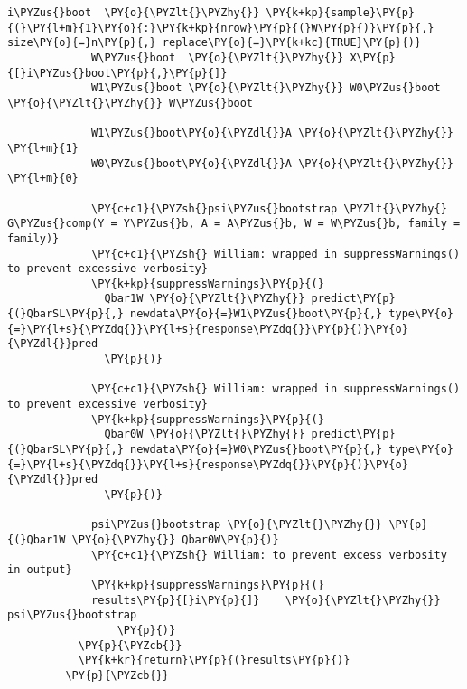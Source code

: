 \begin{Verbatim}[commandchars=\\\{\}]
             i\PYZus{}boot  \PY{o}{\PYZlt{}\PYZhy{}} \PY{k+kp}{sample}\PY{p}{(}\PY{l+m}{1}\PY{o}{:}\PY{k+kp}{nrow}\PY{p}{(}W\PY{p}{)}\PY{p}{,} size\PY{o}{=}n\PY{p}{,} replace\PY{o}{=}\PY{k+kc}{TRUE}\PY{p}{)}
             W\PYZus{}boot  \PY{o}{\PYZlt{}\PYZhy{}} X\PY{p}{[}i\PYZus{}boot\PY{p}{,}\PY{p}{]}
             W1\PYZus{}boot \PY{o}{\PYZlt{}\PYZhy{}} W0\PYZus{}boot \PY{o}{\PYZlt{}\PYZhy{}} W\PYZus{}boot
         
             W1\PYZus{}boot\PY{o}{\PYZdl{}}A \PY{o}{\PYZlt{}\PYZhy{}} \PY{l+m}{1}
             W0\PYZus{}boot\PY{o}{\PYZdl{}}A \PY{o}{\PYZlt{}\PYZhy{}} \PY{l+m}{0}  
               
             \PY{c+c1}{\PYZsh{}psi\PYZus{}bootstrap \PYZlt{}\PYZhy{} G\PYZus{}comp(Y = Y\PYZus{}b, A = A\PYZus{}b, W = W\PYZus{}b, family = family)}
             \PY{c+c1}{\PYZsh{} William: wrapped in suppressWarnings() to prevent excessive verbosity}
             \PY{k+kp}{suppressWarnings}\PY{p}{(}
               Qbar1W \PY{o}{\PYZlt{}\PYZhy{}} predict\PY{p}{(}QbarSL\PY{p}{,} newdata\PY{o}{=}W1\PYZus{}boot\PY{p}{,} type\PY{o}{=}\PY{l+s}{\PYZdq{}}\PY{l+s}{response\PYZdq{}}\PY{p}{)}\PY{o}{\PYZdl{}}pred
               \PY{p}{)} 
         
             \PY{c+c1}{\PYZsh{} William: wrapped in suppressWarnings() to prevent excessive verbosity}
             \PY{k+kp}{suppressWarnings}\PY{p}{(}
               Qbar0W \PY{o}{\PYZlt{}\PYZhy{}} predict\PY{p}{(}QbarSL\PY{p}{,} newdata\PY{o}{=}W0\PYZus{}boot\PY{p}{,} type\PY{o}{=}\PY{l+s}{\PYZdq{}}\PY{l+s}{response\PYZdq{}}\PY{p}{)}\PY{o}{\PYZdl{}}pred
               \PY{p}{)} 
         
             psi\PYZus{}bootstrap \PY{o}{\PYZlt{}\PYZhy{}} \PY{p}{(}Qbar1W \PY{o}{\PYZhy{}} Qbar0W\PY{p}{)}
             \PY{c+c1}{\PYZsh{} William: to prevent excess verbosity in output}
             \PY{k+kp}{suppressWarnings}\PY{p}{(}
             results\PY{p}{[}i\PY{p}{]}    \PY{o}{\PYZlt{}\PYZhy{}} psi\PYZus{}bootstrap
                 \PY{p}{)}
           \PY{p}{\PYZcb{}}
           \PY{k+kr}{return}\PY{p}{(}results\PY{p}{)}
         \PY{p}{\PYZcb{}}
\end{Verbatim}



